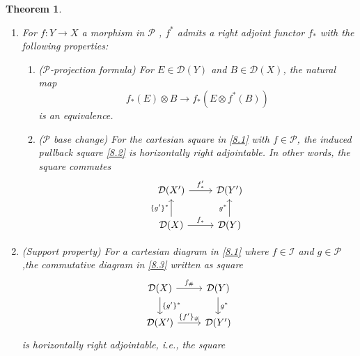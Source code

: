 \documentclass[14pt]{article}
\newtheorem{theorem}{Theorem}[subsection]
\theoremstyle{definition}
\newcommand{\D}{\mathcal{D}}
\renewcommand{\P}{\mathcal{P}}
\newcommand{\I}{\mathscr{I}}
\numberwithin{subsection}{section}
\begin{document}
\begin{theorem}
\begin{enumerate}
\begin{enumerate}
				\begin{equation}\label{8.2}
					\begin{tikzcd}
						\D(X') & \D(Y') \arrow[l,"\lbrace f '\rbrace^*"]  \\
						\D(X ) \arrow[u,"\lbrace g'\rbrace^*"] & \D(Y) \arrow[l,"f^*"] \arrow[u,"g^*"]
					\end{tikzcd}
				\end{equation}
				is horizontally left-adjointable, i.e., there exists a commutative square
				\begin{equation}\label{8.3}
					\begin{tikzcd}
						\D(X') \arrow[r,"\lbrace f'\rbrace_{\#}"]& \D(Y') \\
						\D(X ) \arrow[u,"\lbrace g'\rbrace^*"] \arrow[r,"f_{\#}"] & \D(Y) \arrow[u,"g^*"]
					\end{tikzcd}
				\end{equation}
			\end{enumerate}
			\item For $f: Y \to X$ a  morphism  in $\P$ , $f^*$ admits a right adjoint functor $f_*$ with the following properties:
			\begin{enumerate}
				\item ($\P$-projection formula) For $E \in \D(Y)$ and $B \in \D(X)$, the natural map 
				\begin{equation}\label{proppro}
					f_*(E) \otimes B \to f_*(E \otimes f^*(B)) 
				\end{equation}
				is an equivalence.
				\item ($\P$ base change) For the cartesian square in \cref{8.1} with $f \in \P$, the induced pullback square \cref{8.2} is horizontally right adjointable. In other words, the square commutes
				\begin{equation}\label{8.4}
					\begin{tikzcd}
						\D(X') \arrow[r," f'_*"]& \D(Y') \\
						\D(X ) \arrow[u,"\lbrace g'\rbrace^*"] \arrow[r,"f_*"] & \D(Y) \arrow[u,"g^*"]
					\end{tikzcd}
				\end{equation}
			\end{enumerate} 
			\item (Support property) For a cartesian diagram in \cref{8.1} where $f \in \I$ and $g \in \P$,the commutative diagram in \cref{8.3} written as  square
			\begin{equation}\label{8.5}
				\begin{tikzcd}
					\D(X) \arrow[r,"f_{\#}"] \arrow[d,"\lbrace g' \rbrace ^*"] & \D(Y) \arrow[d,"g^*"] \\
					\D(X') \arrow[r,"\lbrace f' \rbrace_{\#}"] & \D(Y')
				\end{tikzcd}
			\end{equation} 
			is horizontally right adjointable, i.e., the square 
			

\end{enumerate}
\end{theorem}
\end{document}
